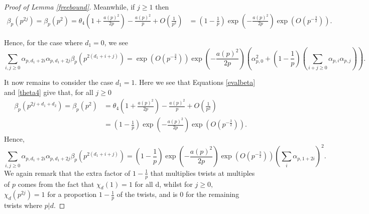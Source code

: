 \documentclass[12pt]{amsart}
\numberwithin{equation}{section}
\numberwithin{thm}{section}
\newcommand{\1}{\mathbf 1}
\begin{document}
\begin{proof}[Proof of Lemma \ref{freebound}]
		Meanwhile, if $j\ge 1$ then \begin{align}
			\beta_p(p^{2j})=\beta_p(p^2)=\theta_4\left(1+\frac{a(p)^2}{2p}\right)- \frac{a(p)^2}{p}+O\left(\frac{1}{p^2}\right)&=
			\left(1-\frac{1}{p}\right)\exp\left(-\frac{a(p)^2}{2p}\right)\exp\left(O\left(p^{-\frac{3}{2}}\right)\right).
		\end{align}
		
		Hence, for the case where $d_1=0$, we see 
		\begin{equation}
		\sum_{i,j\ge 0} \alpha_{p, d_1+2i}\alpha_{p, d_1+2j}\beta_p(p^{2(d_1+i+j)}) =\exp(O(p^{-\frac{3}{2}}))\exp\left(-\frac{a(p)^2}{2p}\right)\left(\alpha_{p,0}^2 +\left(1-\frac{1}{p}\right)\left(\sum_{i+j\ge 0} \alpha_{p,i}\alpha_{p,j}\right)\right).
		\end{equation}
				
		It now remains to consider the case $d_1=1$. Here we see that Equations \eqref{evalbeta} and \eqref{theta4} give that, for all $j\ge 0$
		\begin{align}\label{d=0}
		\beta_p(p^{2j+d_1+d_2})=\beta_p(p^2)&=\theta_4 \left(1+\frac{a(p)^2}{2p}\right)-\frac{a(p)^2}{p}+O\left(\frac{1}{p^2}\right)\\
		&=\left(1-\frac{1}{p}\right)\exp\left(-\frac{a(p)^2}{2p}\right)\exp\left(O\left(p^{-\frac{3}{2}}\right)\right).
		\end{align}
		Hence, 
	\begin{equation}\label{d=1}
			\sum_{i,j\ge 0} \alpha_{p, d_1+2i}\alpha_{p, d_1+2j}\beta_p(p^{2(d_1+i+j)}) =\left(1-\frac{1}{p}\right)\exp\left(-\frac{a(p)^2}{2p}\right)\exp\left(O\left(p^{-\frac{3}{2}}\right)\right)\left(\sum_{i}\alpha_{p,1+2i}\right)^2.
	\end{equation}	
	We again remark that the extra factor of $1-\frac{1}{p}$ that multiplies twists at multiples of $p$ comes from the fact that $\chi_d(1)=1$ for all d, whilst for $j\ge 0,$ $\chi_d(p^{2j})=1$ for a proportion $1-\frac{1}{p}$ of the twists, and is $0$ for the remaining twists where $p|d$. 
	

\end{proof}
\end{document}

